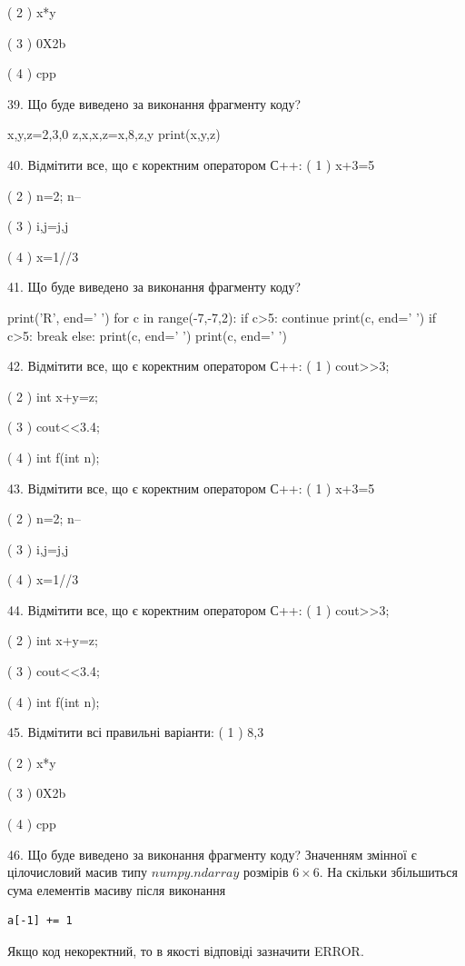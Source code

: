 \documentclass[11pt]{article}
\begin{document}
( 2 ) x*y

( 3 ) 0X2b

( 4 ) cpp

39. Що буде виведено за виконання фрагменту коду?

x,y,z=2,3,0
z,x,x,z=x,8,z,y
print(x,y,z)

40. Відмітити все, що є коректним оператором С++:
( 1 ) x+3=5

( 2 ) n=2; n--

( 3 ) i,j=j,j

( 4 ) x=1//3

41. Що буде виведено за виконання фрагменту коду?

print('R', end=' ')
for c in range(-7,-7,2):
    if c>5:
        continue
        print(c, end=' ')
    if c>5:
        break
    else:
        print(c, end=' ')
    print(c, end=' ')

42. Відмітити все, що є коректним оператором С++:
( 1 ) cout>>3;

( 2 ) int x+y=z;

( 3 ) cout<<3.4;

( 4 ) int f(int n);

43. Відмітити все, що є коректним оператором С++:
( 1 ) x+3=5

( 2 ) n=2; n--

( 3 ) i,j=j,j

( 4 ) x=1//3

44. Відмітити все, що є коректним оператором С++:
( 1 ) cout>>3;

( 2 ) int x+y=z;

( 3 ) cout<<3.4;

( 4 ) int f(int n);

45. Відмітити всі правильні варіанти:
( 1 ) 8,3

( 2 ) x*y

( 3 ) 0X2b

( 4 ) cpp

46. Що буде виведено за виконання фрагменту коду?
Значенням змінної  є цілочисловий масив типу $numpy.ndarray$ розмірів $6{\times}6$. На скільки збільшиться сума елементів масиву  після виконання
\begin{verbatim}
a[-1] += 1
\end{verbatim}


Якщо код некоректний, то в якості відповіді зазначити ERROR.
\end{document}
